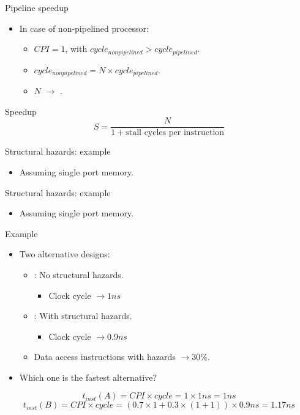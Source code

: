 \begin{frame}[t]{Pipeline speedup}
\begin{itemize}
  \item In case of non-pipelined processor:
    \begin{itemize}
      \item $CPI=1$, with $cycle_{nonpipelined} > cycle_{pipelined}$.
      \item $cycle_{nonpipelined} = N \times cycle_{pipelined}$.
      \item $N$ $\rightarrow$ .
    \end{itemize}
\end{itemize}
\begin{block}{Speedup}
\[
S =
\frac{N}{1 + \text{stall cycles per instruction}}
\]
\end{block}
\end{frame}

\begin{frame}[t]{Structural hazards: example}
\makebox[\textwidth][c]{

}
\begin{itemize}
  \item Assuming single port memory.
\end{itemize}
\end{frame}

\begin{frame}[t]{Structural hazards: example}
\makebox[\textwidth][c]{

}
\begin{itemize}
  \item Assuming single port memory.
\end{itemize}
\end{frame}

\begin{frame}[t]{Example}
\begin{itemize}
  \item Two alternative designs:
    \begin{itemize}
      \item {}: No structural hazards.
        \begin{itemize}
          \item Clock cycle $\rightarrow 1 ns$
        \end{itemize}
      \item {}: With structural hazards.
        \begin{itemize}
          \item Clock cycle $\rightarrow 0.9 ns$
        \end{itemize}
      \item Data access instructions with hazards $\rightarrow 30\%$.
    \end{itemize}
  
  \item Which one is the fastest alternative?
\end{itemize}
\[
t_{inst}(A) =
CPI \times cycle = 1 \times 1 ns = 1 ns
\]
\[
t_{inst}(B) =
CPI \times cycle = (0.7 \times 1 + 0.3 \times (1 + 1)) \times 0.9 ns =
1.17 ns
\]
\end{frame}

